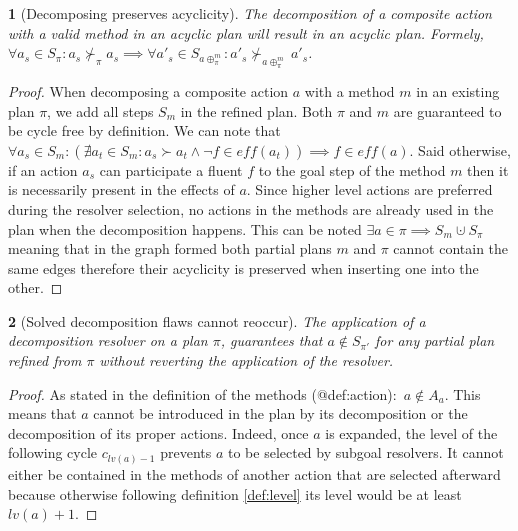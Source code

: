 \documentclass[11pt,a4paper,twoside,openright,titlepage,numbers=noenddot,headinclude,cleardoublepage=empty,openany]{scrreprt}
\theoremstyle{plain}
\newtheorem*{lemma}{\capitalisewords{lemma}}
\theoremstyle{definition}
\theoremstyle{remark}
\begin{document}
\begin{lemma}[Decomposing preserves acyclicity]

The decomposition of a composite action with a valid method in an
acyclic plan will result in an acyclic plan. Formely,
\(\forall a_s \in S_\pi: a_s \nsucc_\pi a_s \implies \forall a'_s \in S_{a \oplus^m_\pi}: a'_s \nsucc_{a \oplus^m_\pi} a'_s\).

\end{lemma}

\begin{proof}

When decomposing a composite action \(a\) with a method \(m\) in an
existing plan \(\pi\), we add all steps \(S_m\) in the refined plan.
Both \(\pi\) and \(m\) are guaranteed to be cycle free by definition. We
can note that
\(\forall a_s \in S_m: \left ( \nexists a_t \in S_m: a_s \succ a_t \land \lnot f \in \mathit{eff}(a_t)\right ) \implies f \in \mathit{eff}(a)\).
Said otherwise, if an action \(a_s\) can participate a fluent \(f\) to
the goal step of the method \(m\) then it is necessarily present in the
effects of \(a\). Since higher level actions are preferred during the
resolver selection, no actions in the methods are already used in the
plan when the decomposition happens. This can be noted
\(\exists a \in \pi \implies S_m \cupdot S_\pi\) meaning that in the
graph formed both partial plans \(m\) and \(\pi\) cannot contain the
same edges therefore their acyclicity is preserved when inserting one
into the other.

\end{proof}

\begin{lemma}[Solved decomposition flaws cannot reoccur]

The application of a decomposition resolver on a plan \(\pi\),
guarantees that \(a \notin S_{\pi'}\) for any partial plan refined from
\(\pi\) without reverting the application of the resolver.

\end{lemma}

\begin{proof}

As stated in the definition of the methods
(@def:action):~\(a \notin A_a\). This means that \(a\) cannot be
introduced in the plan by its decomposition or the decomposition of its
proper actions. Indeed, once \(a\) is expanded, the level of the
following cycle \(c_{lv(a)-1}\) prevents \(a\) to be selected by subgoal
resolvers. It cannot either be contained in the methods of another
action that are selected afterward because otherwise following
definition \ref{def:level} its level would be at least \(lv(a)+1\).

\end{proof}
\end{document}
